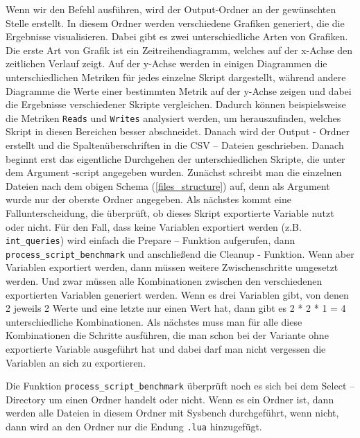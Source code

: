 Wenn wir den Befehl ausführen, wird der Output-Ordner an der gewünschten Stelle erstellt.
In diesem Ordner werden verschiedene Grafiken generiert, die die Ergebnisse visualisieren.
Dabei gibt es zwei unterschiedliche Arten von Grafiken.
Die erste Art von Grafik ist ein Zeitreihendiagramm, welches auf der x-Achse den zeitlichen Verlauf zeigt.
Auf der y-Achse werden in einigen Diagrammen die unterschiedlichen Metriken für jedes einzelne Skript dargestellt, während andere Diagramme die Werte einer bestimmten Metrik auf der y-Achse zeigen und dabei die Ergebnisse verschiedener Skripte vergleichen.
Dadurch können beispielsweise die Metriken \texttt{Reads} und \texttt{Writes} analysiert werden, um herauszufinden, welches Skript in diesen Bereichen besser abschneidet.
Danach wird der Output - Ordner erstellt und die Spaltenüberschriften in die CSV – Dateien geschrieben.
Danach beginnt erst das eigentliche Durchgehen der unterschiedlichen Skripte, die unter dem Argument -script angegeben wurden.
Zunächst schreibt man die einzelnen Dateien nach dem obigen Schema (\ref{files_structure}) auf, denn als Argument wurde nur der oberste Ordner angegeben.
Als nächstes kommt eine Fallunterscheidung, die überprüft, ob dieses Skript exportierte Variable nutzt oder nicht.
Für den Fall, dass keine Variablen exportiert werden (z.B. \texttt{int\_queries}) wird einfach die Prepare – Funktion aufgerufen, dann \texttt{process\_script\_benchmark} und anschließend die Cleanup - Funktion.
Wenn aber Variablen exportiert werden, dann müssen weitere Zwischenschritte umgesetzt werden.
Und zwar müssen alle Kombinationen zwischen den verschiedenen exportierten Variablen generiert werden.
Wenn es drei Variablen gibt, von denen 2 jeweils 2 Werte und eine letzte nur einen Wert hat, dann gibt es 2 * 2 * 1 = 4 unterschiedliche Kombinationen.
Als nächstes muss man für alle diese Kombinationen die Schritte ausführen, die man schon bei der Variante ohne exportierte Variable ausgeführt hat und dabei darf man nicht vergessen die Variablen an sich zu exportieren.



Die Funktion \texttt{process\_script\_benchmark} überprüft noch es sich bei dem Select – Directory um einen Ordner handelt oder nicht.
Wenn es ein Ordner ist, dann werden alle Dateien in diesem Ordner mit Sysbench durchgeführt, wenn nicht, dann wird an den Ordner nur die Endung \texttt{.lua} hinzugefügt.

